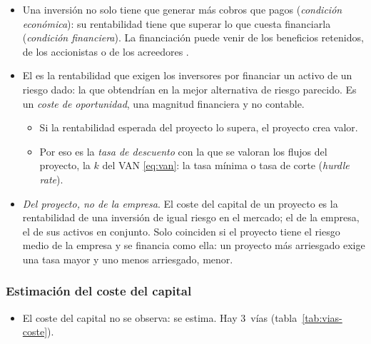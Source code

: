 \documentclass[11pt]{article}
\begin{document}
\begin{itemize}
\item Una inversión no solo tiene que generar más cobros que pagos (\emph{condición económica}): su rentabilidad tiene que superar lo que cuesta financiarla (\emph{condición financiera}). La financiación puede venir de los beneficios retenidos, de los accionistas o de los acreedores .
\item El  es la rentabilidad que exigen los inversores por financiar un activo de un riesgo dado: la que obtendrían en la mejor alternativa de riesgo parecido. Es un \emph{coste de oportunidad}, una magnitud financiera y no contable.
  \begin{itemize}
  \item Si la rentabilidad esperada del proyecto lo supera, el proyecto crea valor.
  \item Por eso es la \emph{tasa de descuento} con la que se valoran los flujos del proyecto, la $k$ del VAN \eqref{eq:van}: la tasa mínima o tasa de corte (\emph{hurdle rate}).
  \end{itemize}
\item \emph{Del proyecto, no de la empresa}. El coste del capital de un proyecto es la rentabilidad de una inversión de igual riesgo en el mercado; el de la empresa, el de sus activos en conjunto. Solo coinciden si el proyecto tiene el riesgo medio de la empresa y se financia como ella: un proyecto más arriesgado exige una tasa mayor y uno menos arriesgado, menor\nocite{BrealeyMyersAllen2020Principles}.
\end{itemize}

\subsubsection{Estimación del coste del capital}\label{sec:coste-estimacion}

\begin{itemize}
\item El coste del capital no se observa: se estima. Hay 3~vías\nocite{Vernimmen2017Corporate} (tabla~\ref{tab:vias-coste}).
\end{itemize}
\end{document}
